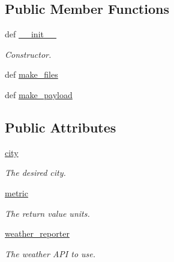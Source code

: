 \subsection*{Public Member Functions}
\begin{DoxyCompactItemize}
\item 
def \hyperlink{classRappCloud_1_1CloudMsgs_1_1WeatherReportCurrent_1_1WeatherReportCurrent_1_1Request_abba4a66592c8296c9615666df0078e78}{\-\_\-\-\_\-init\-\_\-\-\_\-}
\begin{DoxyCompactList}\small\item\em Constructor. \end{DoxyCompactList}\item 
def \hyperlink{classRappCloud_1_1CloudMsgs_1_1WeatherReportCurrent_1_1WeatherReportCurrent_1_1Request_a20f24de590056452d5ac1d41ebada049}{make\-\_\-files}
\item 
def \hyperlink{classRappCloud_1_1CloudMsgs_1_1WeatherReportCurrent_1_1WeatherReportCurrent_1_1Request_a750c2b7adeacfed077d78adcd63ae4a1}{make\-\_\-payload}
\end{DoxyCompactItemize}
\subsection*{Public Attributes}
\begin{DoxyCompactItemize}
\item 
\hyperlink{classRappCloud_1_1CloudMsgs_1_1WeatherReportCurrent_1_1WeatherReportCurrent_1_1Request_aaf35976a95b94cf95151ce0493bd6af1}{city}
\begin{DoxyCompactList}\small\item\em The desired city. \end{DoxyCompactList}\item 
\hyperlink{classRappCloud_1_1CloudMsgs_1_1WeatherReportCurrent_1_1WeatherReportCurrent_1_1Request_a426de479968480827397fc10a0a7cdb0}{metric}
\begin{DoxyCompactList}\small\item\em The return value units. \end{DoxyCompactList}\item 
\hyperlink{classRappCloud_1_1CloudMsgs_1_1WeatherReportCurrent_1_1WeatherReportCurrent_1_1Request_a1676bdd4402094a274203c3e3bc93688}{weather\-\_\-reporter}
\begin{DoxyCompactList}\small\item\em The weather A\-P\-I to use. \end{DoxyCompactList}\end{DoxyCompactItemize}


